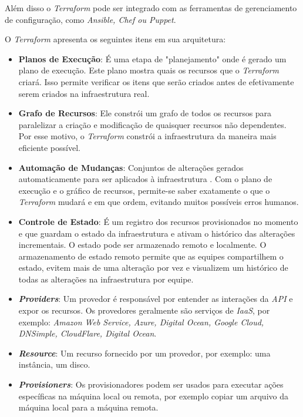 Além disso o \textit{Terraform} pode ser integrado com as ferramentas de gerenciamento de configuração, como \textit{Ansible, Chef ou Puppet}.

O \textit{Terraform} apresenta os seguintes itens em sua arquitetura:
 \begin{itemize}

\item \textbf{Planos de Execução}: É uma etapa de "planejamento" onde é gerado um plano de execução. Este  plano mostra quais os recursos que o \textit{Terraform} criará. Isso permite verificar os itens que serão criados antes de efetivamente serem criados na infraestrutura real.

\item \textbf{Grafo de Recursos}: Ele constrói um grafo de todos os recursos para paralelizar a criação e modificação de quaisquer recursos não dependentes. Por esse motivo, o \textit{Terraform} constrói a infraestrutura da maneira mais eficiente possível.

\item \textbf{Automação de Mudanças}: Conjuntos de alterações gerados automaticamente para ser aplicados à infraestrutura . Com o plano de execução e o gráfico de recursos, permite-se saber exatamente o que o \textit{Terraform} mudará e em que ordem, evitando muitos possíveis erros humanos.

\item \textbf{Controle de Estado}: É um registro dos recursos provisionados no momento e que guardam o estado da infraestrutura e ativam o histórico das alterações incrementais. O estado pode ser armazenado remoto e localmente. O armazenamento de estado remoto permite que as equipes compartilhem o estado, evitem mais de uma alteração por vez e visualizem um histórico de todas as alterações na infraestrutura por equipe.

\item \textbf{\textit{Providers}}: Um provedor é responsável por entender as interações da \textit{API} e expor os recursos. Os provedores geralmente são serviços de \textit{IaaS},  por exemplo: \textit{Amazon
Web Service, Azure, Digital Ocean, Google Cloud, DNSimple, CloudFlare, Digital Ocean}.

\item \textbf{\textit{Resource}}: Um recurso fornecido por um provedor, por exemplo: uma instância, um disco.   

\item \textbf{\textit{Provisioners}}: Os provisionadores podem ser usados para executar ações específicas na máquina local ou remota, por exemplo copiar um arquivo da máquina local para a máquina remota.


\end{itemize}
